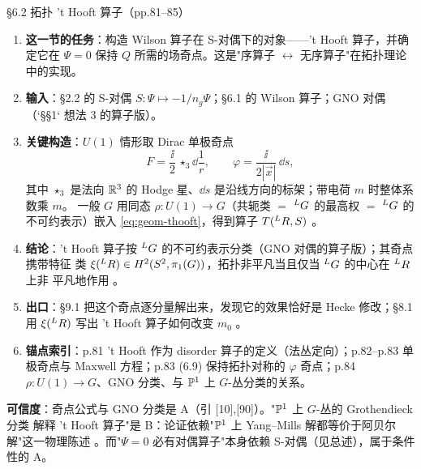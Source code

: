 \begin{kcard}{\S6.2 拓扑 't Hooft 算子（pp.81--85）}
\begin{enumerate}[label=\textbf{\arabic*}]
\item \textbf{这一节的任务}：构造 Wilson 算子在 S-对偶下的对象——'t Hooft 算子，并确定它在 $\Psi=0$
  保持 $Q$ 所需的场奇点。这是"序算子 $\leftrightarrow$ 无序算子"在拓扑理论中的实现。
\item \textbf{输入}：\S2.2 的 S-对偶 $S:\Psi\mapsto-1/n_g\Psi$；\S6.1 的 Wilson 算子；GNO 对偶
  （`\S\S1` 想法 3 的算子版）。
\item \textbf{关键构造}：$U(1)$ 情形取 Dirac 单极奇点
\begin{equation}
F=\frac{\ii}{2}\,\star_3 \dd\frac{1}{r},\qquad
\varphi=\frac{\ii}{2|\vec x|}\,\dd s ,
\label{eq:geom-thooft}
\end{equation}
  其中 $\star_3$ 是法向 $\mathbb{R}^3$ 的 Hodge 星、$\dd s$ 是沿线方向的标架；带电荷 $m$ 时整体系数乘 $m$。
  一般 $G$ 用同态 $\rho:U(1)\to G$（共轭类 $=$ ${}^{L}G$ 的最高权 $=$ ${}^{L}G$ 的不可约表示）嵌入
  \eqref{eq:geom-thooft}，得到算子 $T({}^{L}R,S)$ \pA{}。
\item \textbf{结论}：'t Hooft 算子按 ${}^{L}G$ 的不可约表示分类（GNO 对偶的算子版）；其奇点携带特征
  类 $\xi({}^{L}R)\in H^2(S^2,\pi_1(G))$，拓扑非平凡当且仅当 ${}^{L}G$ 的中心在 ${}^{L}R$ 上非
  平凡地作用 \pA{}。
\item \textbf{出口}：\S9.1 把这个奇点逐分量解出来，发现它的效果恰好是 Hecke 修改；\S8.1 用 $\xi({}^{L}R)$
  写出 't Hooft 算子如何改变 $m_0$ \pA{}。
\item \textbf{锚点索引}：p.81 't Hooft 作为 disorder 算子的定义（法丛定向）；p.82--p.83 单极奇点与
  Maxwell 方程；p.83 (6.9) 保持拓扑对称的 $\varphi$ 奇点；p.84 $\rho:U(1)\to G$、GNO 分类、与
  $\mathbb{P}^1$ 上 $G$-丛分类的关系。
\end{enumerate}
\textbf{可信度}：奇点公式与 GNO 分类是 A（引 [10],[90]）。"$\mathbb{P}^1$ 上 $G$-丛的 Grothendieck 分类
解释 't Hooft 算子"是 B：论证依赖"$\mathbb{P}^1$ 上 Yang--Mills 解都等价于阿贝尔解"这一物理陈述
\pB{}。而"$\Psi=0$ 必有对偶算子"本身依赖 S-对偶（见总述），属于条件性的 A。
\end{kcard}

